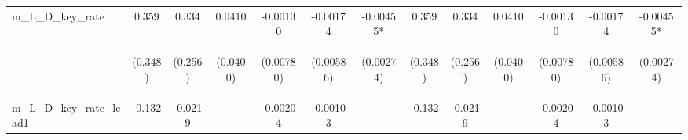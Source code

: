 \documentclass[]{article}
\begin{document}
\begin{center}
\begin{tabular}{lcccccccccccc}
m\_L\_D\_key\_rate & 0.359 & 0.334 & 0.0410 & -0.00130 & -0.00174 & -0.00455* & 0.359 & 0.334 & 0.0410 & -0.00130 & -0.00174 & -0.00455* \\
\vspace{4pt} & \begin{footnotesize}(0.348)\end{footnotesize} & \begin{footnotesize}(0.256)\end{footnotesize} & \begin{footnotesize}(0.0400)\end{footnotesize} & \begin{footnotesize}(0.00780)\end{footnotesize} & \begin{footnotesize}(0.00586)\end{footnotesize} & \begin{footnotesize}(0.00274)\end{footnotesize} & \begin{footnotesize}(0.348)\end{footnotesize} & \begin{footnotesize}(0.256)\end{footnotesize} & \begin{footnotesize}(0.0400)\end{footnotesize} & \begin{footnotesize}(0.00780)\end{footnotesize} & \begin{footnotesize}(0.00586)\end{footnotesize} & \begin{footnotesize}(0.00274)\end{footnotesize} \\
m\_L\_D\_key\_rate\_lead1 & -0.132 & -0.0219 &  & -0.00204 & -0.00103 &  & -0.132 & -0.0219 &  & -0.00204 & -0.00103 &  \\

\end{tabular}
\end{center}
\end{document}
